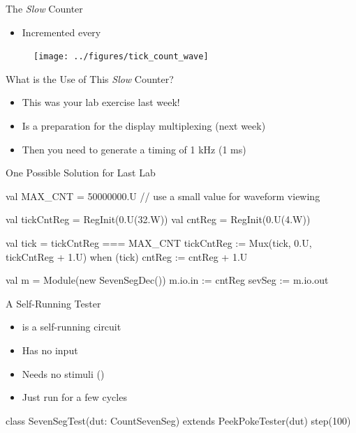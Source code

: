 \begin{frame}[fragile]{The \emph{Slow} Counter}
\begin{itemize}
\item Incremented every 
\end{itemize}
\begin{figure}
  \texttt{[image: ../figures/tick\_count\_wave]}
\end{figure}
\end{frame}

\begin{frame}[fragile]{What is the Use of This \emph{Slow} Counter?}
\begin{itemize}
\item This was your lab exercise last week!
\item Is a preparation for the display multiplexing (next week)
\item Then you need to generate a timing of 1 kHz (1 ms)
\end{itemize}
\end{frame}

\begin{frame}[fragile]{One Possible Solution for Last Lab}
\begin{chisel}
  val MAX_CNT = 50000000.U // use a small value for waveform viewing
  
  val tickCntReg = RegInit(0.U(32.W))
  val cntReg = RegInit(0.U(4.W))
  
  val tick = tickCntReg === MAX_CNT
  tickCntReg := Mux(tick, 0.U, tickCntReg + 1.U)
  when (tick) {
    cntReg := cntReg + 1.U
  }
  
  val m = Module(new SevenSegDec())
  m.io.in := cntReg
  sevSeg := m.io.out
\end{chisel}
\end{frame}

\begin{frame}[fragile]{A Self-Running Tester}
\begin{itemize}
\item {} is a self-running circuit
\item Has no input
\item Needs no stimuli ()
\item Just run for a few cycles
\end{itemize}
\begin{chisel}
class SevenSegTest(dut: CountSevenSeg) extends PeekPokeTester(dut) {
  step(100)
}
\end{chisel}
\end{frame}

